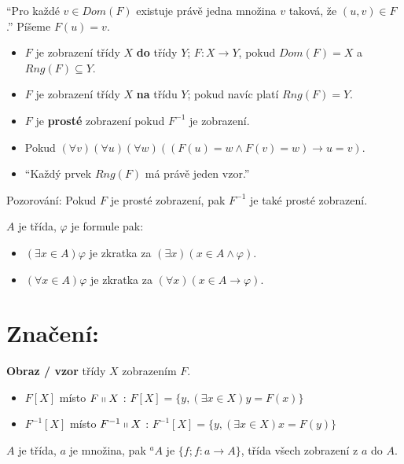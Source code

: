 “Pro každé $v \in Dom(F)$ existuje právě jedna množina $v$ taková, že $(u,v) \in F$.” Píšeme $F(u) = v$.

\begin{definice}
	\begin{itemize}
		\item $F$ je zobrazení třídy $X$ \textbf{do} třídy $Y$; $F: X \to Y$, pokud $Dom(F) = X$ a $Rng(F) \subseteq Y$.
		\item $F$ je zobrazení třídy $X$ \textbf{na} třídu $Y$; pokud navíc platí $Rng(F) = Y$.
		\item $F$ je \textbf{prosté} zobrazení pokud $F^{-1}$ je zobrazení.
		\item Pokud $(\forall v)(\forall u)(\forall w)((F(u) = w \land F(v) = w) \rightarrow u = v)$.
		\item “Každý prvek $Rng(F)$ má právě jeden vzor.”
	\end{itemize}
\end{definice}

Pozorování: Pokud $F$ je prosté zobrazení, pak $F^{-1}$ je také prosté zobrazení.

\begin{definice}
	$A$ je třída, $\varphi$ je formule pak:
	
	\begin{itemize}
		\item $(\exists x \in A) \varphi$ je zkratka za $(\exists x)(x \in A \land \varphi)$.
		\item $(\forall x \in A) \varphi$ je zkratka za $(\forall x)(x \in A \rightarrow \varphi)$.
	\end{itemize}	
\end{definice}

\section{Značení:}

\textbf{Obraz / vzor} třídy $X$ zobrazením $F$.

\begin{itemize}
	\item $F[X]$ místo $F \shortparallel X$ : $F[X] = \{y, (\exists x \in X) y = F(x)\}$
	\item $F^{-1}[X]$ místo $F^{-1} \shortparallel X$ : $F^{-1}[X] = \{y, (\exists x \in X) x = F(y)\}$
\end{itemize}

\begin{definice}
	$A$ je třída, $a$ je množina, pak $^{a}A$ je $\{f; f: a \to A\}$, třída všech zobrazení z $a$ do $A$.
\end{definice}

